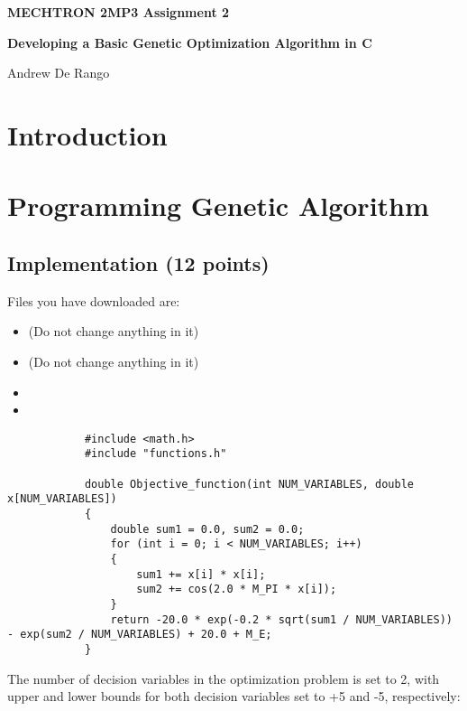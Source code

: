\documentclass[12pt]{article}
\begin{document}
	
	\justifying
	
	\begin{center}
		\textbf{{\large MECHTRON 2MP3 Assignment 2}}
		
		\textbf{Developing a Basic Genetic Optimization Algorithm in C} 
		
		Andrew De Rango
	\end{center}
	

	
	
	
	\section{Introduction}
	
	
	\section{Programming Genetic Algorithm}

	\subsection{Implementation (12 points)}
	
	Files you have downloaded are:
	
	\begin{itemize}
		\item {} (Do not change anything in it)
		\item {} (Do not change anything in it)
		\item {}
		\item {}
	\end{itemize}

		
		\begin{lstlisting}
			#include <math.h>
			#include "functions.h"
			
			double Objective_function(int NUM_VARIABLES, double x[NUM_VARIABLES])
			{
				double sum1 = 0.0, sum2 = 0.0;
				for (int i = 0; i < NUM_VARIABLES; i++)
				{
					sum1 += x[i] * x[i];
					sum2 += cos(2.0 * M_PI * x[i]);
				}
				return -20.0 * exp(-0.2 * sqrt(sum1 / NUM_VARIABLES)) - exp(sum2 / NUM_VARIABLES) + 20.0 + M_E;
			}
		\end{lstlisting}
	
	

	
	
	The number of decision variables in the optimization problem is set to 2, with upper and lower bounds for both decision variables set to +5 and -5, respectively:
	
\end{document}
